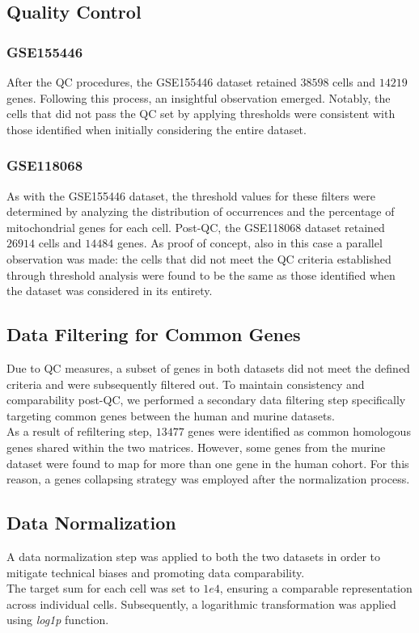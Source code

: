 \documentclass[10pt]{SelfArx} %
\begin{document}
\subsection{Quality Control}\label{sec:quality_results}
\subsubsection*{GSE155446}
After the QC procedures, the GSE155446 dataset retained $38598$ cells and $14219$ genes. 
Following this process, an insightful observation emerged. Notably, the cells that did not pass the QC set by applying thresholds were consistent with those identified when initially considering the entire dataset. 

\subsubsection*{GSE118068}
As with the GSE155446 dataset, the threshold values for these filters were determined by analyzing the distribution of occurrences and the percentage of mitochondrial genes for each cell. 
Post-QC, the GSE118068 dataset retained $26914$ cells and $14484$ genes. 
As proof of concept, also in this case a parallel observation was made: the cells that did not meet the QC criteria established through threshold analysis were found to be the same as those identified when the dataset was considered in its entirety.

\subsection{Data Filtering for Common Genes}\label{sec:fltering_common_results}
Due to QC measures, a subset of genes in both datasets did not meet the defined criteria and were subsequently filtered out.
To maintain consistency and comparability post-QC, we performed a secondary data filtering step specifically targeting common genes between the human and murine datasets. \\
As a result of refiltering step, $13477$ genes were identified as common homologous genes shared within the two matrices. However, some genes from the murine dataset were found to map for more than one gene in the human cohort. For this reason, a genes collapsing strategy was employed after the normalization process. 

\subsection{Data Normalization}\label{sec:normalization_results}
A data normalization step was applied to both the two datasets in order to mitigate technical biases and promoting data comparability. \\
The target sum for each cell was set to $1e4$, ensuring a comparable representation across individual cells. Subsequently, a logarithmic transformation was applied using \textit{log1p} function. \\
\end{document}
